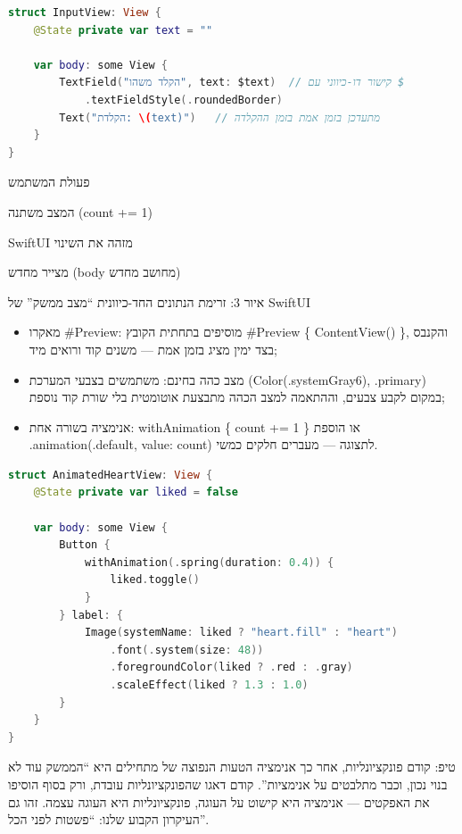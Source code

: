 \begin{lstlisting}[language=Swift]
struct InputView: View {
    @State private var text = ""

    var body: some View {
        TextField("הקלד משהו", text: $text)  // קישור דו-כיווני עם $
            .textFieldStyle(.roundedBorder)
        Text("הקלדת: \(text)")   // מתעדכן בזמן אמת בזמן ההקלדה
    }
}
\end{lstlisting}

פעולת המשתמש

המצב משתנה (count += 1)

‏SwiftUI מזהה את השינוי

מצייר מחדש (body מחושב מחדש)

\begin{center}\small\color{gray}איור 3: זרימת הנתונים החד-כיוונית “מצב ממשק” של SwiftUI\end{center}


\begin{itemize}
  \item מאקרו \#Preview: מוסיפים בתחתית הקובץ \#Preview \{ ContentView() \}, והקנבס בצד ימין מציג בזמן אמת — משנים קוד ורואים מיד;
  \item מצב כהה בחינם: משתמשים בצבעי המערכת (Color(.systemGray6), .primary) במקום לקבע צבעים, וההתאמה למצב הכהה מתבצעת אוטומטית בלי שורת קוד נוספת;
  \item אנימציה בשורה אחת: withAnimation \{ count += 1 \} או הוספת .animation(.default, value: count) לתצוגה — מעברים חלקים כמשי.
\end{itemize}

\begin{lstlisting}[language=Swift]
struct AnimatedHeartView: View {
    @State private var liked = false

    var body: some View {
        Button {
            withAnimation(.spring(duration: 0.4)) {
                liked.toggle()
            }
        } label: {
            Image(systemName: liked ? "heart.fill" : "heart")
                .font(.system(size: 48))
                .foregroundColor(liked ? .red : .gray)
                .scaleEffect(liked ? 1.3 : 1.0)
        }
    }
}
\end{lstlisting}

\begin{tcbinfo}{טיפ: קודם פונקציונליות, אחר כך אנימציה}
הטעות הנפוצה של מתחילים היא “הממשק עוד לא בנוי נכון, וכבר מתלבטים על אנימציות”. קודם דאגו שהפונקציונליות עובדת, ורק בסוף הוסיפו את האפקטים — אנימציה היא קישוט על העוגה, פונקציונליות היא העוגה עצמה. זהו גם העיקרון הקבוע שלנו: “פשטות לפני הכל”.

\end{tcbinfo}

